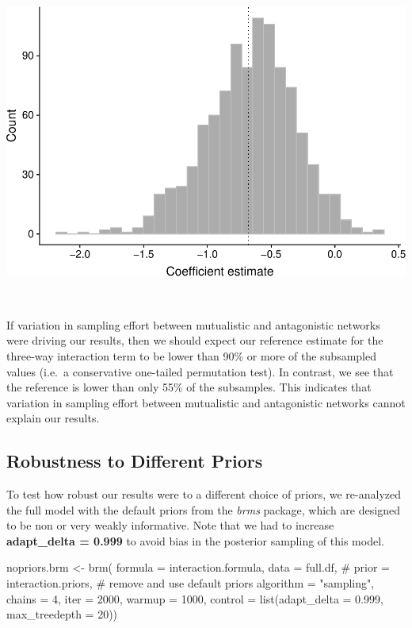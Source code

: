 \documentclass[11pt,]{article}
\newenvironment{Shaded}{}{}
\newcommand{\KeywordTok}[1]{\textcolor[rgb]{0.00,0.00,1.00}{#1}}
\newcommand{\DataTypeTok}[1]{#1}
\newcommand{\DecValTok}[1]{#1}
\newcommand{\FloatTok}[1]{#1}
\newcommand{\StringTok}[1]{\textcolor[rgb]{0.00,0.50,0.50}{#1}}
\newcommand{\CommentTok}[1]{\textcolor[rgb]{0.00,0.50,0.00}{#1}}
\newcommand{\NormalTok}[1]{#1}
\begin{document}
\includegraphics{reproduce_analyses_files/figure-latex/plot subsample of three-way term-1.pdf}

~

If variation in sampling effort between mutualistic and antagonistic
networks were driving our results, then we should expect our reference
estimate for the three-way interaction term to be lower than 90\% or
more of the subsampled values (i.e.~a conservative one-tailed
permutation test). In contrast, we see that the reference is lower than
only 55\% of the subsamples. This indicates that variation in sampling
effort between mutualistic and antagonistic networks cannot explain our
results.

\subsection{Robustness to Different
Priors}\label{robustness-to-different-priors}

To test how robust our results were to a different choice of priors, we
re-analyzed the full model with the default priors from the \emph{brms}
package, which are designed to be non or very weakly informative. Note
that we had to increase \textbf{adapt\_delta = 0.999} to avoid bias in
the posterior sampling of this model.

\begin{Shaded}
\begin{Highlighting}[]
\NormalTok{nopriors.brm <-}\StringTok{ }\KeywordTok{brm}\NormalTok{(}
  \DataTypeTok{formula =}\NormalTok{ interaction.formula, }\DataTypeTok{data =}\NormalTok{ full.df, }
  \CommentTok{# prior = interaction.priors, # remove and use default priors}
  \DataTypeTok{algorithm =} \StringTok{"sampling"}\NormalTok{, }\DataTypeTok{chains =} \DecValTok{4}\NormalTok{, }\DataTypeTok{iter =} \DecValTok{2000}\NormalTok{, }\DataTypeTok{warmup =} \DecValTok{1000}\NormalTok{, }
  \DataTypeTok{control =} \KeywordTok{list}\NormalTok{(}\DataTypeTok{adapt_delta =} \FloatTok{0.999}\NormalTok{, }\DataTypeTok{max_treedepth =} \DecValTok{20}\NormalTok{))}
\end{Highlighting}
\end{Shaded}
\end{document}
